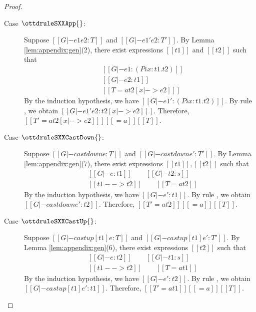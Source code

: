 \begin{proof}
\begin{description}
        \item[Case $\ottdruleSXXApp{}$:] $\quad$ \\
        Suppose $[[G |- e1 e2 :T]]$ and $[[G |- e1' e2 :T']]$. By Lemma
\ref{lem:appendix:gen}(2), there exist expressions $[[t1]]$ and $[[t2]]$ such
that 
        \begin{align*}
            &[[G |- e1:(Pi x:t1.t2)]] \\
            &[[G |- e2:t1]]\\
            &[[T =a t2 [x |-> e2] ]]
        \end{align*}
        By the induction hypothesis, we have $[[G |- e1':(Pi x:t1.t2)]]$. By rule
, we obtain $[[G |- e1' e2 : t2[x |-> e2] ]]$. Therefore, $[[T'
=a t2[x |-> e2] ]] [[=a]] [[T]]$.
        
        \item[Case $\ottdruleSXXCastDown{}$:] $\quad$ \\
        Suppose $[[G |- castdown e :T]]$ and $[[G |- castdown e' :T']]$. By
Lemma \ref{lem:appendix:gen}(7), there exist expressions $[[t1]], [[t2]]$ such
that 
        \begin{align*}
            &[[G |- e:t1]] \qquad [[G |- t2:s]] \\
            &[[t1 --> t2]] \qquad [[T =a t2 ]]
        \end{align*}
        By the induction hypothesis, we have $[[G |- e':t1]]$. By rule
, we obtain $[[G |- castdown e' : t2 ]]$. Therefore, $[[T'
=a t2]] [[=a]] [[T]]$.

\item[Case $\ottdruleSXXCastUp{}$:] $\quad$ \\
        Suppose $[[G |- castup [t1] e :T]]$ and $[[G |- castup [t1] e' :T']]$. By
Lemma \ref{lem:appendix:gen}(6), there exist expressions $[[t2]]$ such
that 
        \begin{align*}
            &[[G |- e:t2]] \qquad [[G |- t1:s]] \\
            &[[t1 --> t2]] \qquad [[T =a t1 ]]
        \end{align*}
        By the induction hypothesis, we have $[[G |- e':t2]]$. By rule
, we obtain $[[G |- castup [t1] e' : t1 ]]$. Therefore, $[[T'
=a t1]] [[=a]] [[T]]$.
        

\end{description}
\end{proof}
